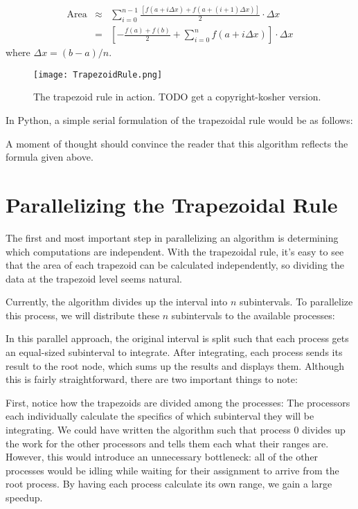 \begin{eqnarray*}%
\textrm{Area} 
&\approx&
\sum_{i=0}^{n-1}\frac{[f(a+i \Delta x)+f(a + (i+1) \Delta x)]}{2}\cdot\Delta x \\
&=&
\left[-\frac{f(a)+f(b)}{2}+\sum_{i=0}^{n}f(a+i\Delta x)\right]\cdot\Delta x
\end{eqnarray*}
where $\Delta x=(b-a)/n$.

\begin{figure}[h]
\centering
\texttt{[image: TrapezoidRule.png]}
\caption{The trapezoid rule in action. TODO get a copyright-kosher version.}
\label{fig:trapezoidal_rule}
\end{figure}

In Python, a simple serial formulation of the trapezoidal rule would be as follows:



A moment of thought should convince the reader that this algorithm reflects the formula given above. 

\section*{Parallelizing the Trapezoidal Rule}
The first and most important step in parallelizing an algorithm is determining which computations are independent. With the trapezoidal rule, it's easy to see that the area of each trapezoid can be calculated independently, so dividing the data at the trapezoid level seems natural.

Currently, the algorithm divides up the interval into $n$ subintervals. To parallelize this process, we will distribute these $n$ subintervals to the available processes:



In this parallel approach, the original interval is split such that each process gets an equal-sized subinterval to integrate. After integrating, each process sends its result to the root node, which sums up the results and displays them. Although this is fairly straightforward, there are two important things to note:

First, notice how the trapezoids are divided among the processes: The processors each individually calculate the specifics of which subinterval they will be integrating. We could have written the algorithm such that process 0 divides up the work for the other processors and tells them each what their ranges are. However, this would introduce an unnecessary bottleneck: all of the other processes would be idling while waiting for their assignment to arrive from the root process. By having each process calculate its own range, we gain a large speedup.

